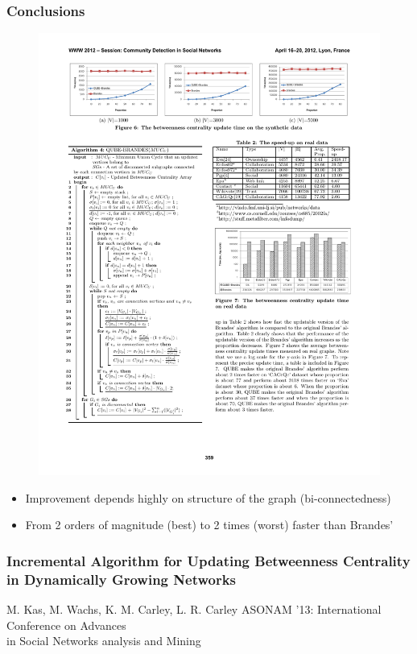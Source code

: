 \begin{frame}
  \frametitle{Conclusions}

  \begin{figure}[t]
    \centering
    \includegraphics[width=\textwidth, height=0.6\textheight, keepaspectratio]{imgs/qube-results2}
  \end{figure}
  
  \begin{itemize}
    \item Improvement depends highly on structure of the graph (bi-connectedness)
    \item From 2 orders of magnitude (best) to 2 times (worst) faster than Brandes'
  \end{itemize}
    
\end{frame}


\begin{frame}
  \frametitle{Incremental Algorithm for Updating Betweenness Centrality in Dynamically Growing Networks}
  \centering
  \vfill
  {\huge M. Kas, M. Wachs, K. M. Carley, L. R. Carley}
  \vfill
  {\large ASONAM '13: International Conference on Advances \\in Social Networks analysis and Mining}
\end{frame}


